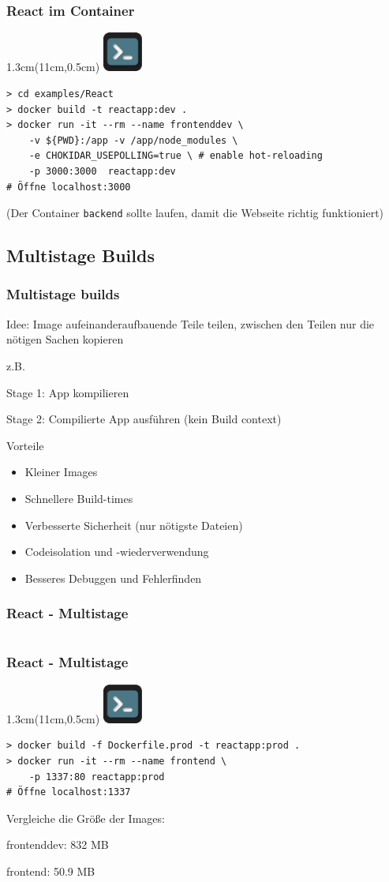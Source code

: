 \documentclass[22pt]{beamer}
\newcommand{\code}[1]{\colorbox{gray!15}{\texttt{#1}}}
\newcommand{\terminal}{
    \begin{textblock*}{1.3cm}(11cm,0.5cm) %
    \includegraphics[width=1.3cm]{Bilder/terminal2.png}
    \end{textblock*}
}
\begin{document}
\begin{frame}[fragile]
    \frametitle{React im Container}
    \terminal
\begin{verbatim}
> cd examples/React
> docker build -t reactapp:dev .
> docker run -it --rm --name frontenddev \
    -v ${PWD}:/app -v /app/node_modules \
    -e CHOKIDAR_USEPOLLING=true \ # enable hot-reloading
    -p 3000:3000  reactapp:dev
# Öffne localhost:3000

\end{verbatim}
\footnotesize (Der Container \code{backend} sollte laufen, damit die Webseite richtig funktioniert)
\end{frame}

\subsection{Multistage Builds}
\begin{frame}[t]
    \frametitle{Multistage builds}
    Idee: Image aufeinanderaufbauende Teile teilen, zwischen den Teilen nur die nötigen Sachen kopieren

    z.B. 
    
    Stage 1: App kompilieren
    
    Stage 2: Compilierte App ausführen (kein Build context) 
    \vspace{8pt}\pause

    Vorteile
    \begin{itemize}
        \item Kleiner Images
        \item Schnellere Build-times
        \item Verbesserte Sicherheit (nur nötigste Dateien)
        \item Codeisolation und -wiederverwendung
        \item Besseres Debuggen und Fehlerfinden
    \end{itemize} 
\end{frame}

\begin{frame}[fragile]
    \frametitle{React - Multistage}
    \inputminted[fontsize=\footnotesize, frame=lines]{dockerfile}{../examples/React/Dockerfile.prod}
\end{frame}

\begin{frame}[fragile]
    \frametitle{React - Multistage}
    \terminal
\begin{verbatim}
> docker build -f Dockerfile.prod -t reactapp:prod .
> docker run -it --rm --name frontend \
    -p 1337:80 reactapp:prod
# Öffne localhost:1337
\end{verbatim}
\pause
\vspace{8pt}
Vergleiche die Größe der Images:\pause

frontenddev: 832 MB

frontend: 50.9 MB

\end{frame}
\end{document}
